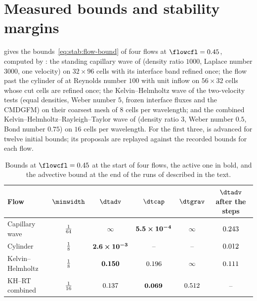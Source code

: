 \section{Measured bounds and stability margins}\label{sec:stab:measured}
\begin{sloppypar}
 gives the bounds~\cref{eq:stab:flow-bound} of four
flows at $\flowcfl=0.45$, computed by : the standing
capillary wave of  (density ratio $1000$,
Laplace number $3000$, one velocity) on $32\times96$ cells with its
interface band refined once; the flow past the cylinder of
 at Reynolds number $100$ with unit inflow on
$56\times32$ cells whose cut cells are refined once; the Kelvin--Helmholtz
wave of the two-velocity tests (equal densities, Weber number $5$, frozen
interface fluxes and the CMDGFM) on their coarsest mesh of $8$ cells per
wavelength; and the combined Kelvin--Helmholtz--Rayleigh--Taylor wave of
 (density ratio $3$, Weber number
$0.5$, Bond number $0.75$) on $16$ cells per wavelength. For the first three,
 is advanced for twelve initial bounds; its proposals are
replayed against the recorded bounds for each flow.
\end{sloppypar}

\begin{table}[tbp]
  \centering\small
  \caption{Bounds at $\flowcfl=0.45$ at the start of four flows, the active
  one in bold, and the advective bound at the end of the runs of
   described in the text.}\label{tab:stab:cases}
  \begin{tabular}{@{}lccccc@{}}
    \toprule
    Flow & $\minwidth$ & $\dtadv$ & $\dtcap$ & $\dtgrav$ & $\dtadv$ after the steps\\
    \midrule
    Capillary wave & $\tfrac{1}{64}$ & $\infty$ & $\bm{5.5\times10^{-4}}$ & $\infty$ & $0.243$\\
    Cylinder & $\tfrac{1}{8}$ & $\bm{2.6\times10^{-3}}$ & -- & -- & $0.012$\\
    Kelvin--Helmholtz & $\tfrac{1}{8}$ & $\bm{0.150}$ & $0.196$ & $\infty$ & $0.111$\\
    KH--RT combined & $\tfrac{1}{16}$ & $0.137$ & $\bm{0.069}$ & $0.512$ & --\\
    \bottomrule
  \end{tabular}
\end{table}

